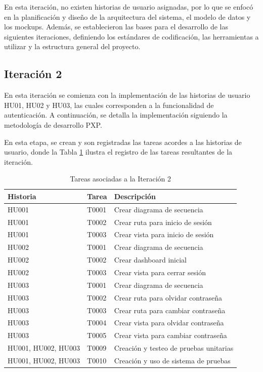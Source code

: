 En esta iteración, no existen historias de usuario asignadas, por lo que se enfocó en la planificación y diseño de la arquitectura del sistema, el modelo de datos y los mockups. Además, se establecieron las bases para el desarrollo de las siguientes iteraciones, definiendo los estándares de codificación, las herramientas a utilizar y la estructura general del proyecto.

\subsection{Iteración 2}

En esta iteración se comienza con la implementación de las historias de usuario HU01, HU02 y HU03, las cuales corresponden a la funcionalidad de autenticación. A continuación, se detalla la implementación siguiendo la metodología de desarrollo PXP.

\vspace{0.3cm}
En esta etapa, se crean y son registradas las tareas acordes a las historias de usuario, donde la Tabla \ref{tab:tareas} ilustra el registro de las tareas resultantes de la iteración.

\begin{table}[H]
  \centering
  \caption{Tareas asociadas a la Iteración 2}
  \label{tab:tareas}
  \renewcommand{\arraystretch}{1.2}
  \begin{tabular}{|l|l|p{8cm}|}
    \hline
    \textbf{Historia} & \textbf{Tarea} & \textbf{Descripción} \\
    \hline
    HU001 & T0001 & Crear diagrama de secuencia \\ \hline
    HU001 & T0002 & Crear ruta para inicio de sesión \\ \hline
    HU001 & T0003 & Crear vista para inicio de sesión \\ \hline
    HU002 & T0001 & Crear diagrama de secuencia \\ \hline
    HU002 & T0002 & Crear dashboard inicial \\ \hline
    HU002 & T0003 & Crear vista para cerrar sesión \\ \hline
    HU003 & T0001 & Crear diagrama de secuencia \\ \hline
    HU003 & T0002 & Crear ruta para olvidar contraseña \\ \hline
    HU003 & T0003 & Crear ruta para cambiar contraseña \\ \hline
    HU003 & T0004 & Crear vista para olvidar contraseña \\ \hline
    HU003 & T0005 & Crear vista para cambiar contraseña \\ \hline
    HU001, HU002, HU003 & T0009 & Creación y testeo de pruebas unitarias \\ \hline
    HU001, HU002, HU003 & T0010 & Creación y uso de sistema de pruebas \\ \hline
  \end{tabular}
\end{table}

